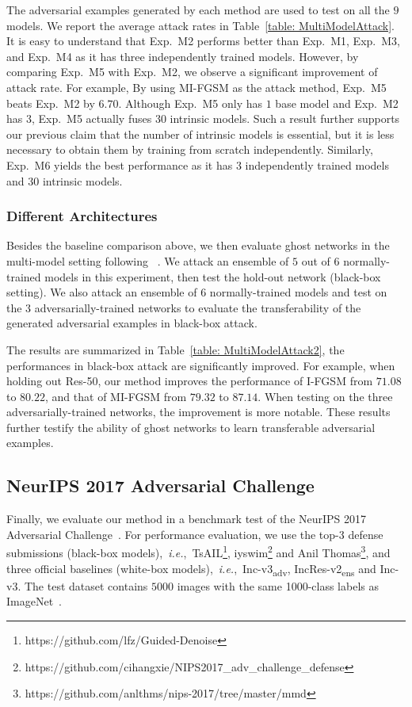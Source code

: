 \documentclass[letterpaper]{article} %
\newcommand{\citet}[1]{\citeauthor{#1} \shortcite{#1}}
\def\ie{\emph{i.e.}}
\begin{document}
The adversarial examples generated by each method are used to test on all the $9$ models. We report the average attack rates in Table~\ref{table: MultiModelAttack}. It is easy to understand that Exp.~M2 performs better than Exp.~M1, Exp.~M3, and Exp.~M4 as it has three independently trained models. However, by comparing Exp.~M5 with Exp.~M2, we observe a significant improvement of attack rate. For example, By using MI-FGSM as the attack method, Exp.~M5 beats Exp.~M2 by $6.70$.
Although Exp.~M5 only has $1$ base model and Exp.~M2 has $3$, Exp.~M5 actually fuses $30$ intrinsic models.  Such a result further supports our previous claim that the number of intrinsic models is essential, but it is less necessary to obtain them by training from scratch independently. Similarly, Exp.~M6 yields the best performance as it has $3$ independently trained models and $30$ intrinsic models.



\subsubsection{Different Architectures}
Besides the baseline comparison above, we then evaluate ghost networks in the multi-model setting following~\citet{liu2016delving}. We attack an ensemble of $5$ out of $6$ normally-trained models in this experiment, then test the hold-out network (black-box setting). We also attack an ensemble of $6$ normally-trained models and test on the $3$ adversarially-trained networks to evaluate the transferability of the generated adversarial examples in black-box attack.

The results are summarized in Table~\ref{table: MultiModelAttack2}, the performances in black-box attack are significantly improved.
For example, when holding out Res-50, our method improves the performance of I-FGSM from $71.08$ to $80.22$, and that of MI-FGSM from $79.32$ to $87.14$.
When testing on the three adversarially-trained networks, the improvement is more notable. These results further testify the ability of ghost networks to learn transferable adversarial examples.

\subsection{NeurIPS 2017 Adversarial Challenge} \label{sec: nipsExp}
Finally, we evaluate our method in a benchmark test of the NeurIPS 2017 Adversarial Challenge~\cite{kurakin2018adversarial}. For performance evaluation, we use the top-3 defense submissions (black-box models),~\ie,~TsAIL\footnote{https://github.com/lfz/Guided-Denoise}, iyswim\footnote{https://github.com/cihangxie/NIPS2017\_adv\_challenge\_defense} and Anil Thomas\footnote{https://github.com/anlthms/nips-2017/tree/master/mmd}, and three official baselines (white-box models),~\ie,~Inc-v3\textsubscript{adv}, IncRes-v2\textsubscript{ens} and Inc-v3. The test dataset contains $5000$ images with the same 1000-class labels as ImageNet~\cite{deng2009imagenet}.
\end{document}
